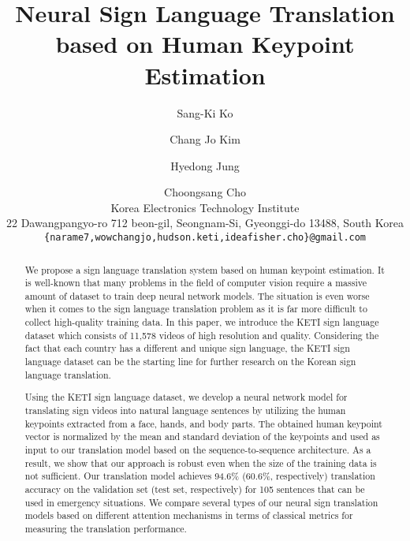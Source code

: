 \documentclass[10pt,twocolumn,letterpaper]{article}
\begin{document}
\title{Neural Sign Language Translation based on Human Keypoint Estimation}

\author{Sang-Ki Ko \and Chang Jo Kim \and Hyedong Jung \and Choongsang Cho\\
Korea Electronics Technology Institute\\
22 Dawangpangyo-ro 712 beon-gil, Seongnam-Si, Gyeonggi-do 13488, South Korea\\
{\tt\small \{narame7,wowchangjo,hudson.keti,ideafisher.cho\}@gmail.com}
}

\maketitle

\begin{abstract}
We propose a sign language translation system based on human keypoint estimation. It is well-known that many problems in the field of computer vision require a massive amount of dataset to train deep neural network models. The situation is even worse when it comes to the sign language translation problem as it is far more difficult to collect high-quality training data. In this paper, we introduce the KETI sign language dataset which consists of 11,578 videos of high resolution and quality. Considering the fact that each country has a different and unique sign language, the KETI sign language dataset can be the starting line for further research on the Korean sign language translation.

Using the KETI sign language dataset, we develop a neural network model for translating sign videos into natural language sentences by utilizing the human keypoints extracted from a face, hands, and body parts. The obtained human keypoint vector is normalized by the mean and standard deviation of the keypoints and used as input to our translation model based on the sequence-to-sequence architecture. As a result, we show that our approach is robust even when the size of the training data is not sufficient. Our translation model achieves 94.6\% (60.6\%, respectively) translation accuracy on the validation set (test set, respectively) for 105 sentences that can be used in emergency situations. We compare several types of our neural sign translation models based on different attention mechanisms in terms of classical metrics for measuring the translation performance.
\end{abstract}
\end{document}
